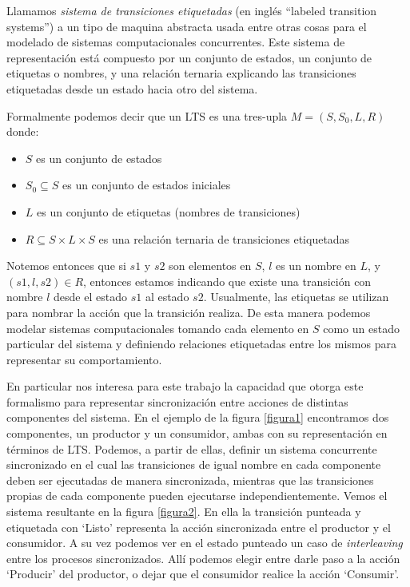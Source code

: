 \documentclass[titlepage, 12pt]{book}
\begin{document}
Llamamos \textit{sistema de transiciones etiquetadas} (en ingl\'es ``labeled transition systems'') a un tipo de maquina abstracta usada entre otras cosas para el modelado de sistemas computacionales concurrentes. Este sistema de representaci\'on est\'a compuesto por un conjunto de estados, un conjunto de etiquetas o nombres, y una relaci\'on ternaria explicando las transiciones etiquetadas desde un estado hacia otro del sistema.

Formalmente podemos decir que un LTS es una tres-upla $M = (S,S_{0},L,R)$ donde:
\begin{itemize}
\item $S$ es un conjunto de estados
\item $S_0 \subseteq S$ es un conjunto de estados iniciales
\item $L$ es un conjunto de etiquetas (nombres de transiciones)
\item $R \subseteq S \times L \times S$ es una relaci\'on ternaria de transiciones etiquetadas
\end{itemize}
Notemos entonces que si $s1$ y $s2$ son elementos en $S$, $l$ es un nombre en $L$, y $(s1,l,s2) \in R$, entonces estamos indicando que existe una transici\'on con nombre $l$ desde el estado $s1$ al estado $s2$. Usualmente, las etiquetas se utilizan para nombrar la acci\'on que la transici\'on realiza. De esta manera podemos modelar sistemas computacionales tomando cada elemento en $S$ como un estado particular del sistema y definiendo relaciones etiquetadas entre los mismos para representar su comportamiento.

En particular nos interesa para este trabajo la capacidad que otorga este formalismo para representar sincronizaci\'on entre acciones de distintas componentes del sistema. En el ejemplo de la figura \ref{figura1} encontramos dos componentes, un productor y un consumidor, ambas con su representaci\'on en t\'erminos de LTS. Podemos, a partir de ellas, definir un sistema concurrente sincronizado en el cual las transiciones de igual nombre en cada componente deben ser ejecutadas de manera sincronizada, mientras que las transiciones propias de cada componente pueden ejecutarse independientemente. Vemos el sistema resultante en la figura \ref{figura2}. En ella la transici\'on punteada y etiquetada con `Listo' representa la acci\'on sincronizada entre el productor y el consumidor. A su vez podemos ver en el estado punteado un caso de \emph{interleaving} entre los procesos sincronizados. All\'i podemos elegir entre darle paso a la acci\'on `Producir' del productor, o dejar que el consumidor realice la acci\'on `Consumir'. 
\end{document}
